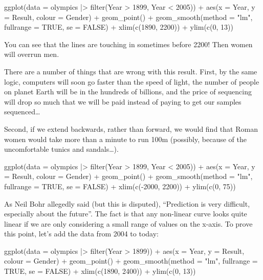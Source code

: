 \documentclass[
  letterpaper,
  DIV=11,
  numbers=noendperiod]{scrreprt}
\newenvironment{Shaded}{\begin{snugshade}}{\end{snugshade}}
\newcommand{\NormalTok}[1]{\textcolor[rgb]{0.00,0.23,0.31}{#1}}
\begin{document}
\begin{Shaded}
\begin{Highlighting}[]
\NormalTok{ggplot(data = olympics |\textgreater{} filter(Year \textgreater{} 1899, Year \textless{} 2005)) + }
\NormalTok{  aes(x = Year, y = Result, colour = Gender) + }
\NormalTok{  geom\_point() + geom\_smooth(method = "lm", fullrange = TRUE, se = FALSE) +}
\NormalTok{  xlim(c(1890, 2200)) + ylim(c(0, 13))}
\end{Highlighting}
\end{Shaded}

You can see that the lines are touching in sometimes before 2200! Then
women will overrun men.

There are a number of things that are wrong with this result. First, by
the same logic, computers will soon go faster than the speed of light,
the number of people on planet Earth will be in the hundreds of
billions, and the price of sequencing will drop so much that we will be
paid instead of paying to get our samples sequenced\ldots{}

Second, if we extend backwards, rather than forward, we would find that
Roman women would take more than a minute to run 100m (possibly, because
of the uncomfortable tunics and sandals\ldots).

\begin{Shaded}
\begin{Highlighting}[]
\NormalTok{ggplot(data = olympics |\textgreater{} filter(Year \textgreater{} 1899, Year \textless{} 2005)) + }
\NormalTok{  aes(x = Year, y = Result, colour = Gender) + }
\NormalTok{  geom\_point() + geom\_smooth(method = "lm", fullrange = TRUE, se = FALSE) +}
\NormalTok{  xlim(c({-}2000, 2200)) + ylim(c(0, 75))}
\end{Highlighting}
\end{Shaded}

As Neil Bohr allegedly said (but this is disputed), ``Prediction is very
difficult, especially about the future''. The fact is that any
non-linear curve looks quite linear if we are only considering a small
range of values on the x-axis. To prove this point, let's add the data
from 2004 to today:

\begin{Shaded}
\begin{Highlighting}[]
\NormalTok{ggplot(data = olympics |\textgreater{} filter(Year \textgreater{} 1899)) + }
\NormalTok{  aes(x = Year, y = Result, colour = Gender) + }
\NormalTok{  geom\_point() + geom\_smooth(method = "lm", fullrange = TRUE, se = FALSE) +}
\NormalTok{  xlim(c(1890, 2400)) + ylim(c(0, 13))}
\end{Highlighting}
\end{Shaded}
\end{document}

